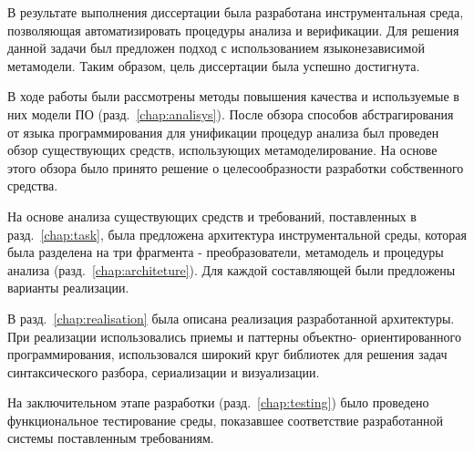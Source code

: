 \conclusion

В результате выполнения диссертации была разработана инструментальная среда,
позволяющая автоматизировать процедуры анализа и верификации. Для решения данной
задачи был предложен подход с использованием языконезависимой метамодели. Таким
образом, цель диссертации была успешно достигнута.

В ходе работы были рассмотрены методы повышения качества и используемые в них
модели ПО (разд.~\ref{chap:analisys}). После обзора способов абстрагирования от
языка программирования для унификации процедур анализа был проведен обзор
существующих средств, использующих метамоделирование. На основе этого обзора
было принято решение о целесообразности разработки собственного средства.

На основе анализа существующих средств и требований, поставленных в
разд.~\ref{chap:task},  была предложена архитектура инструментальной среды,
которая была разделена на три фрагмента - преобразователи, метамодель и
процедуры анализа (разд.~\ref{chap:architeture}). Для каждой составляющей были
предложены варианты реализации.

В разд.~\ref{chap:realisation} была описана реализация разработанной
архитектуры. При реализации использовались приемы и паттерны объектно-
ориентированного программирования, использовался широкий круг библиотек для
решения задач синтаксического разбора, сериализации и визуализации.

На заключительном этапе разработки (разд.~\ref{chap:testing}) было проведено
функциональное тестирование среды, показавшее соответствие разработанной системы
поставленным требованиям.
